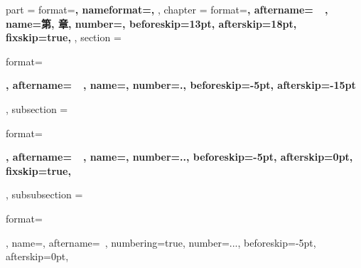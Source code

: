 {{        \renewcommand{\contentsname}    {目录}
        \renewcommand{\listfigurename}  {图目录}
        \renewcommand{\listtablename}   {表目录}
    }
    {
        \ctexset
        {
            part =
            {
                format=\centering{}\bfseries,
                nameformat=\centering\heiti\fontsize{48}{48}\bfseries,
            },
            chapter =
            {
                format=\centering{}\bfseries,
                aftername=~~,
                name={第, 章},
                number=,
                beforeskip=13pt,
                afterskip=18pt,
                fixskip=true,
            },
            section =
            {
                format=\raggedright{}\bfseries,
                aftername=~~,
                name={},
                number=.,
                beforeskip=-5pt,
                afterskip=-15pt
            },
            subsection =
            {
                format=\raggedright{}\bfseries,
                aftername=~~,
                name={},
                number=..,
                beforeskip=-5pt,
                afterskip=0pt,
                fixskip=true,
            },
            subsubsection =
            {
                format=\raggedright{},
                name={},
                aftername=~,
                numbering=true,
                number=...,
                beforeskip=-5pt,
                afterskip=0pt,
            }
        }

        \renewcommand{\chapternonum}[1]
        {   %
            \phantomsection
            \addcontentsline{toc}{chapter}{#1}
            \markboth{#1}{#1}
            \chapter*{\bfseries \songti #1}
        }

        \renewcommand{\contentsname}    {目录}
        \renewcommand{\listfigurename}  {图目录}
        \renewcommand{\listtablename}   {表目录}
    }
}
{}
